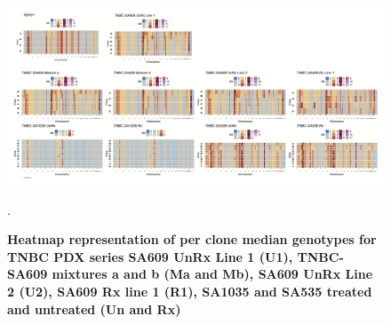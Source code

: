 \begin{figure}
\centering
  \includegraphics[width=\textwidth]{Figures/chap4/mediangenotypespdx.png}
\caption[Heatmaps of median genotypes]
	{\small
	\textbf{Heatmap representation of per clone median genotypes for TNBC PDX series SA609 UnRx Line 1 (U1), TNBC-SA609 mixtures a and b (Ma and Mb), SA609 UnRx Line 2 (U2), SA609 Rx line 1 (R1), SA1035 and SA535 treated and untreated (Un and Rx)}}.
	  
	 	\label{fig:mediangenotypes}
\end{figure} 

